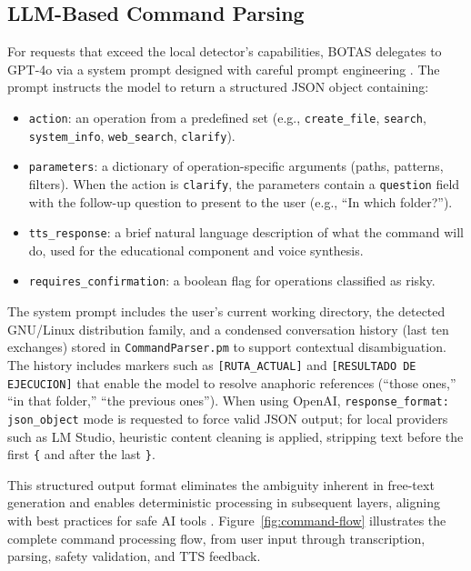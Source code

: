 \documentclass[10pt,a4paper]{article}
\begin{document}
\subsection{LLM-Based Command Parsing}
\label{subsec:llm-parsing}

For requests that exceed the local detector's capabilities, BOTAS delegates to GPT-4o via a system prompt designed with careful prompt engineering \citep{Wei2022}. The prompt instructs the model to return a structured JSON object containing:

\begin{itemize}[noitemsep,topsep=0pt]
    \item \texttt{action}: an operation from a predefined set (e.g., \texttt{create\_file}, \texttt{search}, \texttt{system\_info}, \texttt{web\_search}, \texttt{clarify}).
    \item \texttt{parameters}: a dictionary of operation-specific arguments (paths, patterns, filters). When the action is \texttt{clarify}, the parameters contain a \texttt{question} field with the follow-up question to present to the user (e.g., ``In which folder?'').
    \item \texttt{tts\_response}: a brief natural language description of what the command will do, used for the educational component and voice synthesis.
    \item \texttt{requires\_confirmation}: a boolean flag for operations classified as risky.
\end{itemize}

The system prompt includes the user's current working directory, the detected GNU/Linux distribution family, and a condensed conversation history (last ten exchanges) stored in \texttt{CommandParser.pm} to support contextual disambiguation. The history includes markers such as \texttt{[RUTA\_ACTUAL]} and \texttt{[RESULTADO DE EJECUCION]} that enable the model to resolve anaphoric references (``those ones,'' ``in that folder,'' ``the previous ones''). When using OpenAI, \texttt{response\_format: json\_object} mode is requested to force valid JSON output; for local providers such as LM Studio, heuristic content cleaning is applied, stripping text before the first \texttt{\{} and after the last \texttt{\}}.

This structured output format eliminates the ambiguity inherent in free-text generation and enables deterministic processing in subsequent layers, aligning with best practices for safe AI tools \citep{Schick2024, Yao2023}. Figure~\ref{fig:command-flow} illustrates the complete command processing flow, from user input through transcription, parsing, safety validation, and TTS feedback.
\end{document}
